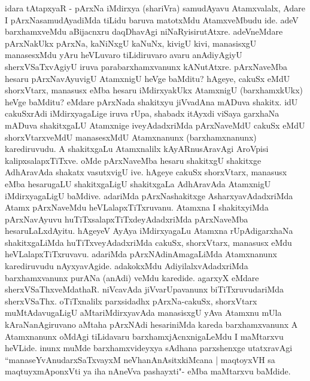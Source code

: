\begin{artha}
idara tAtapxyaR - pArxNa iMdirxya (shariVra) samudAyavu Atamxvalalx, Adare I pArxNasamudAyadiMda tiLidu baruva matotxMdu AtamxveMbudu ide. adeV barxhamxveMdu aBijacnxru daqDhavAgi niNaRyisirutAtxre. adeVneMdare pArxNakUkx pArxNa, kaNiNxgU kaNuNx, kivigU kivi, manasisxgU manasesxMdu yAru heVLuvaro tiLidiruvaro avaru anAdiyAgiyU sherxVSaTxvAgiyU iruva  parabarxhamxvanunx kANutAtxre. pArxNaveMba hesaru pArxNavAyuvigU AtamxnigU heVge baMditu? hAgeye, cakuSx eMdU shorxVtarx, manasusx eMba hesaru iMdirxyakUkx AtamxnigU (barxhamxkUkx) heVge baMditu? eMdare pArxNada shakitxyu jiVvadAna mADuva shakitx. idU cakuSxrAdi iMdirxyagaLige iruva rUpa, shabadx itAyxdi viSaya garxhaNa mADuva shakitxgaLU Atamxnige iveyAdadxriMda pArxNaveMdU cakuSx eMdU shorxVtarxveMdU manasesxMdU Atamxnanunx (barxhamxnanunx) karediruvudu. A shakitxgaLu Atamxnalilx kAyARnusAravAgi AroVpisi kalipxsalapxTiTxve. oMde pArxNaveMba hesaru shakitxgU shakitxge AdhAravAda shakatx vasutxvigU ive. hAgeye cakuSx shorxVtarx, manasusx eMba hesarugaLU shakitxgaLigU shakitxgaLa AdhAravAda AtamxnigU iMdirxyagaLigU baMdive. adariMda pArxNashakitxge AsharxyavAdadxriMda Atamx pArxNaveMdu heVLalapxTiTxruvanu. Atamxna I shakitxyiMda pArxNavAyuvu huTiTxsalapxTiTxdeyAdadxriMda pArxNaveMba hesaruLaLxdAyitu. hAgeyeV AyAya iMdirxyagaLu Atamxna rUpAdigarxhaNa shakitxgaLiMda huTiTxveyAdadxriMda cakuSx, shorxVtarx, manasusx eMdu heVLalapxTiTxruvavu. adariMda pArxNAdinAmagaLiMda Atamxnanunx karediruvudu nAyxyavAgide. adakokxMdu AdiyilalxvAdadxriMda barxhamxvanunx purANa (anAdi) veMdu karedide. agarxyX eMdare sherxVSaThxveMdathaR. niVcavAda jiVvarUpavanunx biTiTxruvudariMda sherxVSaThx. oTiTxnalilx parxsidadhx pArxNa-cakuSx, shorxVtarx muMtAdavugaLigU aMtariMdirxyavAda manasisxgU yAva Atamxnu mUla kAraNanAgiruvano aMtaha pArxNAdi hesariniMda kareda barxhamxvanunx A Atamxnanunx oMdAgi tiLidavaru barxhamxjAcnxnigaLeMdu I maMtarxvu heVLide. inunx muMde barxhamxvideyxya sAdhana parxshenxge utatxravAgi ``manaseYvAnudarxSaTxvayxM neVhanAnAsitxkiMcana | maqtoyxVH sa maqtuyxmAponxVti ya iha nAneVva pashayxti"\mdash  - eMba maMtarxvu baMdide.
\end{artha}


